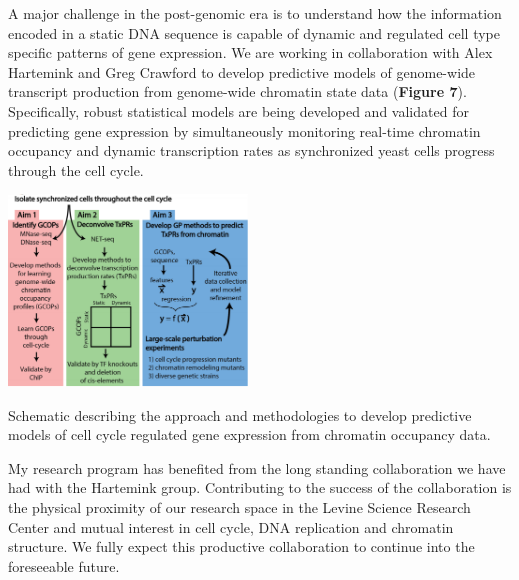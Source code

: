 A major challenge in the post-genomic era is to understand how the information encoded in a static DNA sequence is capable of dynamic and regulated cell type specific patterns of gene expression. We are working in collaboration with Alex Hartemink and Greg Crawford to develop predictive models of genome-wide transcript production from genome-wide chromatin state data ({\color{dukeblue}\textbf{Figure 7}}). Specifically, robust statistical models are being developed and validated for predicting gene expression by simultaneously monitoring real-time chromatin occupancy and dynamic transcription rates as synchronized yeast cells progress through the cell cycle.  
\begin{floatingfigure}[l]{2.5in}
\vspace{-5mm}
\begin{center}
\includegraphics[width=2.5in]{r35_figures/gcop_strategy.png}
\end{center}
\vspace{2mm}
\caption{Schematic describing the approach and methodologies to develop predictive models of cell cycle regulated gene expression from chromatin occupancy data. }%
\end{floatingfigure}

My research program has benefited from the long standing collaboration we have had with the Hartemink group\citep{MacAlpine2010-ju,Belsky2015-li}.  Contributing to the success of the collaboration is the physical proximity of our research space in the Levine Science Research Center and mutual interest in cell cycle, DNA replication and chromatin structure.  We fully expect this productive collaboration to continue into the foreseeable future. 

\pagebreak




